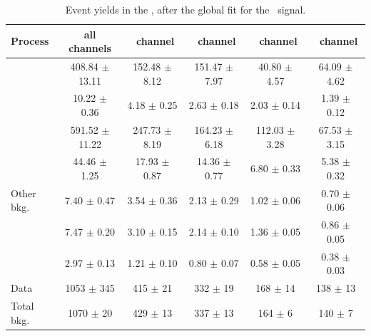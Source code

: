 \begin{landscape}
	\vspace*{\fill}
	\begin{table}[htbp]
		\centering
		\caption{Event yields  in the \WZCR, after the global fit for the \Zut\ signal.  }	
		\begin{tabular} {l c c c c c  }
			\toprule
			Process & all channels & \mumumu\ channel & \emumu\ channel & \eemu\ channel &\eee\ channel \\
			\midrule
			\NPL\ \DY  & 408.84 $ \pm $ 13.11 & 152.48 $\pm$ 8.12 &151.47 $\pm$ 7.97 & 40.80 $\pm$ 4.57 & 64.09 $\pm$ 4.62 \\ 
			\ttZ    	& 10.22 $ \pm $ 0.36  &  4.18 $\pm$  0.25 &  2.63 $\pm$ 0.18 &   2.03 $\pm$ 0.14 &  1.39 $\pm$ 0.12 \\ 
			\WZ 		& 591.52 $ \pm $ 11.22& 247.73 $\pm$ 8.19 &164.23 $\pm$ 6.18 & 112.03 $\pm$ 3.28 & 67.53 $\pm$ 3.15 \\ 
			\ZZ 		& 44.46 $ \pm $ 1.25  & 17.93 $\pm$  0.87 &14.36  $\pm$ 0.77 &   6.80 $\pm$ 0.33 & 5.38 $\pm$ 0.32 \\ 
			Other bkg. 	& 7.40 $ \pm $ 0.47   &  3.54 $\pm$  0.36 &  2.13 $\pm$ 0.29 &   1.02 $\pm$ 0.06 & 0.70 $\pm$ 0.06 \\ 
			\tZq 		& 7.47 $ \pm $ 0.20   &  3.10 $\pm$  0.15 &  2.14 $\pm$ 0.10 &   1.36 $\pm$ 0.05 & 0.86  $\pm$ 0.05 \B \\ 
			\kZut  		& 2.97 $ \pm $ 0.13   &  1.21 $\pm$  0.10 & 0.80 $\pm$ 0.07 &   0.58 $\pm$ 0.05 & 0.38 $\pm$ 0.03 \T\B\\
			\hdashline
			Data        & 1053 $ \pm $ 345 & 415 $\pm$ 21 & 332 $\pm$ 19 & 168 $\pm$ 14 & 138 $\pm$ 13 \T \\
			Total bkg.  & 1070 $ \pm $ 20 & 429 $\pm$ 13 & 337 $\pm$ 13 & 164 $\pm$ 6 & 140 $\pm$ 7 \\
			\bottomrule
		\end{tabular}
		\label{tab:PYieldWZCR}
	\end{table}
	\vspace*{\fill}
\end{landscape}

